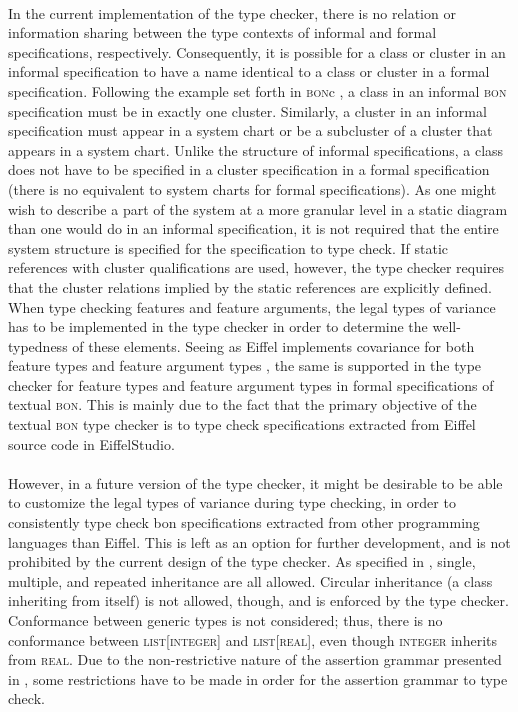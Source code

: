 \paragraph{} In the current implementation of the type checker, there is no relation or information sharing between the type contexts of informal and formal specifications, respectively. Consequently, it is possible for a class or cluster in an informal specification to have a name identical to a class or cluster in a formal specification.
Following the example set forth in \textsc{bon}c \cite{bonc}, a class in an informal \textsc{bon} specification must be in exactly one cluster. Similarly, a cluster in an informal specification must appear in a system chart or be a subcluster of a cluster that appears in a system chart.
Unlike the structure of informal specifications, a class does not have to be specified in a cluster specification in a formal specification (there is no equivalent to system charts for formal specifications). As one might wish to describe a part of the system at a more granular level in a static diagram than one would do in an informal specification, it is not required that the entire system structure is specified for the specification to type check. If static references with cluster qualifications are used, however, the type checker requires that the cluster relations implied by the static references are explicitly defined.
When type checking features and feature arguments, the legal types of variance has to be implemented in the type checker in order to determine the well-typedness of these elements. Seeing as Eiffel implements covariance for both feature types and feature argument types  \cite[the~Covariance~rule]{meyer2001}, the same is supported in the type checker for feature types and feature argument types in formal specifications of textual \textsc{bon}. This is mainly due to the fact that the primary objective of the textual \textsc{bon} type checker is to type check specifications extracted from Eiffel source code in EiffelStudio.
\paragraph{} However, in a future version of the type checker, it might be desirable to be able to customize the legal types of variance during type checking, in order to consistently type check bon specifications extracted from other programming languages than Eiffel. This is left as an option for further development, and is not prohibited by the current design of the type checker.
As specified in \cite[p.~65]{walden1995}, single, multiple, and repeated inheritance are all allowed. Circular inheritance (a class inheriting from itself) is not allowed, though, and is enforced by the type checker. Conformance between generic types is not considered; thus, there is no conformance between \textsc{list}[\textsc{integer}] and \textsc{list}[\textsc{real}], even though \textsc{integer} inherits from \textsc{real}.
Due to the non-restrictive nature of the assertion grammar presented in \cite{walden1995}, some restrictions have to be made in order for the assertion grammar to type check.
